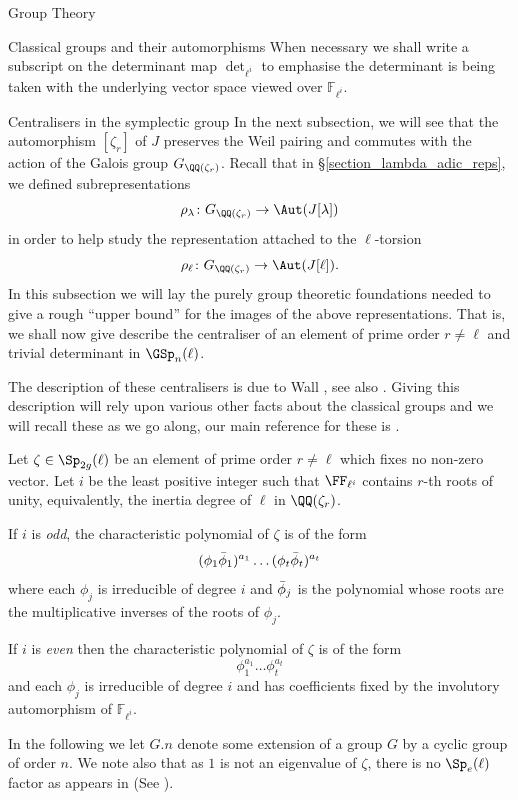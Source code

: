 \documentclass[11pt,a4paper]{article}
\newcommand{\Fli}{\mathbb{F}_{\ell^i}}
\newcommand{\rcyclo}{\QQ(\zeta_r)}
\newcommand{\GQr}{G_{\QQ(\zeta_{r})}}
\begin{document}
\begin{section}{Group Theory}
\begin{subsection}{Classical groups and their automorphisms}
When necessary we shall write a subscript on the determinant map $\det_{\ell^i}$ to emphasise the determinant is being taken with the underlying vector space viewed over $\Fli$.
\end{subsection}
\begin{subsection}{Centralisers in the symplectic group}
\label{subsection_centralisers_in_GSp}
In the next subsection, we will see that the automorphism $[\zeta_r]$ of $J$ preserves the Weil pairing and commutes with the action of the Galois group $\GQr$.
Recall that in \S \ref{section_lambda_adic_reps}, we defined subrepresentations
\[ \rho_\lambda\colon \GQr \rightarrow \Aut(J[\lambda])
\]
in order to help study the representation attached to the $\ell$-torsion
\[\rho_\ell \colon \GQr \rightarrow \Aut(J[\ell]).
\]
In this subsection we will lay the purely group theoretic foundations needed to give a rough ``upper bound'' for the images of the above representations.
That is, we shall now give describe the centraliser of an element of prime order $r \neq \ell$ and trivial determinant in $\GSp_n(\ell)$. 


The description of these centralisers is due to Wall \cite{wall}, see also \cite[Chapter 3.4.1]{Burness}.
Giving this description will rely upon  various other facts about the classical groups and we will recall these as we go along, our main reference for these is \cite{KleidmanLiebeck}.


Let $\zeta \in \Sp_{2g}(\ell)$ be an element of prime order $r \neq \ell$ which fixes no non-zero vector. Let $i$ be the least positive integer such that $\FF_{\ell^i}$ contains $r$-th roots of unity, equivalently, the inertia degree of $\ell$ in $\rcyclo$.


If $i$ is \emph{odd}, the characteristic polynomial of $\zeta$ is of the form
$$ (\phi_1 \Bar{\phi}_1 )^{a_1}\ldots (\phi_t \Bar{\phi}_t )^{a_t}$$
where each $\phi_j$ is irreducible of degree $i$ and $\Bar{\phi}_j$ is the polynomial whose roots are the multiplicative inverses of the roots of $\phi_j$.

If $i$ is \emph{even} then the characteristic polynomial of $\zeta$ is of the form
$$ \phi_1^{a_1}\ldots \phi_t^{a_t}$$
and each $\phi_j$ is irreducible of degree $i$ and has coefficients fixed by the involutory automorphism of $\Fli$.



In the following we let $G.n$ denote some extension of a group $G$ by a cyclic group of order $n$. We note also that as $1$ is not an eigenvalue of $\zeta$, there is no $\Sp_e(\ell)$ factor as appears in \cite{Burness} (See \cite[Prop. 3.4.3]{Burness}).


\end{subsection}
\end{section}
\end{document}
